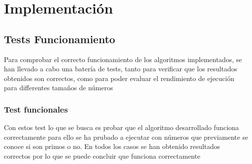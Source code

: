 \section{Implementación}
\subsection{Tests Funcionamiento }
Para comprobar el correcto funcionamiento de los algoritmos implementados, se han llevado a cabo una batería de tests, tanto para verificar que los resultados obtenidos son correctos, como para poder evaluar el rendimiento de ejecución para differentes tamaños de números


\subsubsection{Test funcionales}

Con estos test lo que se busca es probar que el algoritmo desarrollado funciona correctamente para ello se ha prubado a ejecutar con números que previamente se conoce si son primos o no. En todos los casos se han obtenido resultados correctos por lo que se puede concluir que funciona correctamente
\begin{figure}[H]
\end{figure}
  